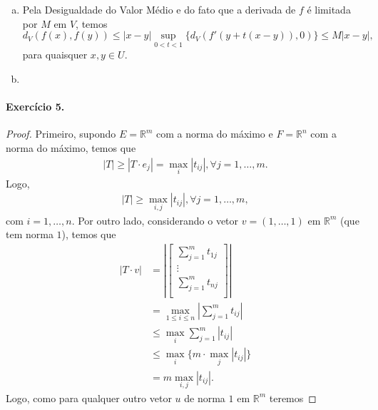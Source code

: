 \documentclass[12pt,a4paper]{article}
\newcommand{\R}{\mathbb{R}}
\begin{document}
\begin{enumerate}[a)]
        \item Pela Desigualdade do Valor Médio e do fato que a derivada de $f$
        é limitada por $M$ em $V$, temos
        \begin{equation*}
            d_V(f(x), f(y)) \leq |x-y| \sup_{0<t<1} \{ d_V(f'(y + t(x-y)), 0) \}
                            \leq M |x-y|,
        \end{equation*}
        para quaisquer $x,y\in U$.
        
        \item
    \end{enumerate}
\paragraph{Exercício 5.}
    \begin{proof}
        Primeiro, supondo $E = \R^m$ com a norma do máximo e $F = \R^n$ com
        a norma do máximo, temos que
        \begin{align*}
            |T| \geq |T\cdot e_j| = \max_i |t_{ij}|, \forall j = 1, \dots, m.
        \end{align*}
        Logo,
        \begin{align*}
            |T| \geq \max_{i,j} |t_{ij}|, \forall j = 1, \dots, m,
        \end{align*}
        com $i = 1, \dots, n$. Por outro lado, considerando o vetor $v = (1,\dots,1)$
        em $\R^m$ (que tem norma $1$), temos que
        \begin{align*}
            |T \cdot v|
            &= \left|\begin{bmatrix}
                \displaystyle{\sum_{j=1}^m t_{1j}} \\
                \vdots \\
                \displaystyle{\sum_{j=1}^m t_{nj}} \\
            \end{bmatrix}\right| \\
            &= \max_{1\leq i\leq n} \left| \displaystyle{\sum_{j=1}^m t_{ij}} \right| \\
            &\leq \max_i \displaystyle{\sum_{j=1}^m |t_{ij}|} \\
            &\leq \max_i \{m\cdot\max_j |t_{ij}|\} \\
            &= m\max_{i,j} |t_{ij}|.
        \end{align*}
        Logo, como para qualquer outro vetor $u$ de norma $1$ em $\R^m$ teremos

\end{proof}
\end{document}
